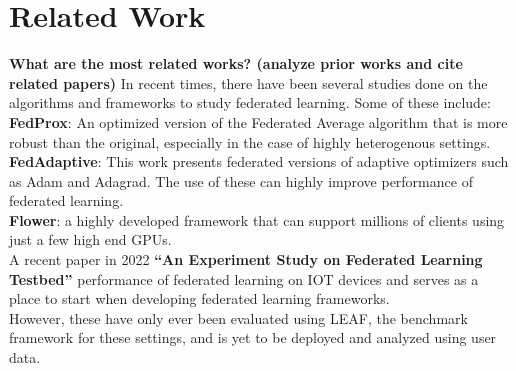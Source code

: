 \section{Related Work}
    \textbf{What are the most related works? (analyze prior works and cite related papers)}
    In recent times, there have been several studies done on the algorithms and frameworks to study federated learning. Some of these include:\\

    \textbf{FedProx}: An optimized version of the Federated Average algorithm that is more robust than the original, especially in the case of highly heterogenous settings. \\

    \textbf{FedAdaptive}: This work presents federated versions of adaptive optimizers such as Adam and Adagrad. The use of these can highly improve performance of federated learning.\\

    \textbf{Flower}: a highly developed framework that can support millions of clients using just a few high end GPUs.\\

    A recent paper in 2022 \textbf{“An Experiment Study on Federated Learning Testbed”} performance of federated learning on IOT devices and serves as a place to start when developing federated learning frameworks.\\

    However, these have only ever been evaluated using LEAF, the benchmark framework for these settings, and is yet to be deployed and analyzed using user data.


